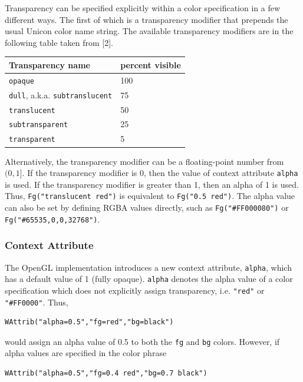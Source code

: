 \documentclass[letterpaper,12pt]{article}
\begin{document}
Transparency can be specified explicitly within a color specification in a
few different ways. The first of which is a transparency modifier that
prepends the usual Unicon color name string. The available transparency
modifiers are in the following table taken from [2].

\begin{center}
\begin{tabular}{|l | l|}\hline
Transparency name & percent visible \\\hline
\texttt{opaque} & 100 \\
\texttt{dull}, a.k.a. \texttt{subtranslucent} & 75 \\
\texttt{translucent} & 50 \\
\texttt{subtransparent} & 25 \\
\texttt{transparent} & 5 \\\hline
\end{tabular}
\end{center}

\noindent
Alternatively, the transparency modifier can be a floating-point
number from $(0,1]$. If the transparency modifier is 0, then the value
of context attribute \texttt{alpha} is used. If the transparency modifier is
greater than 1, then an alpha of 1 is used.
Thus, \texttt{Fg("translucent red")} is equivalent to \texttt{Fg("0.5 red")}.
The alpha value can also be set by defining RGBA values directly, such as
\texttt{Fg("\#FF000080")} or \texttt{Fg("\#65535,0,0,32768")}.

\subsubsection{Context Attribute}

The OpenGL implementation introduces a new context attribute, \texttt{alpha},
which has a default value of 1 (fully opaque). 
\texttt{alpha} denotes the alpha value of
a color specification which does not explicitly assign transparency, i.e.
\texttt{"red"} or \texttt{"\#FF0000"}. Thus,

\begin{verbatim}
WAttrib("alpha=0.5","fg=red","bg=black")
\end{verbatim}

\noindent
would assign an alpha value of 0.5 to both the \texttt{fg} and \texttt{bg} 
colors. However, if alpha values are specified in the color phrase

\begin{verbatim}
WAttrib("alpha=0.5","fg=0.4 red","bg=0.7 black")
\end{verbatim}
\end{document}
